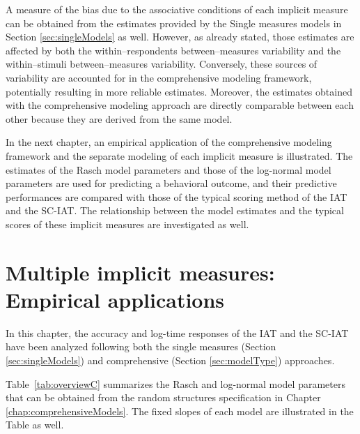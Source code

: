 \documentclass[12pt]{book}
\begin{document}
A measure of the bias due to the associative conditions of each implicit measure can be obtained from the estimates provided by the Single measures models in Section \ref{sec:singleModels} as well. However, as already stated, those estimates are affected by both the within--respondents between--measures variability and the within--stimuli between--measures variability. Conversely, these sources of variability are accounted for in the comprehensive modeling framework, potentially resulting in more reliable estimates. Moreover, the estimates obtained with the comprehensive modeling approach are directly comparable between each other because they are derived from the same model.

In the next chapter, an empirical application of the comprehensive modeling framework and the separate modeling of each implicit measure is illustrated.
	The estimates of the Rasch model parameters and those of the log-normal model parameters are used for predicting a behavioral outcome, and their predictive performances are compared with those of the typical scoring method of the IAT and the SC-IAT. 
	The relationship between the model estimates and the typical scores of these implicit measures are investigated as well. 


\chapter[Multiple implicit measures: Empirical applications]{Multiple implicit measures: Empirical applications} \label{chap:comprehensiveApplications}

In this chapter, the accuracy and log-time responses of the IAT and the SC-IAT have been analyzed following both the single measures (Section \ref{sec:singleModels}) and comprehensive  (Section \ref{sec:modelType}) approaches.


Table~\ref{tab:overviewC} summarizes the Rasch and log-normal model parameters that can be obtained from the random structures specification in Chapter \ref{chap:comprehensiveModels}.  
The fixed slopes of each model are illustrated in the Table as well.
\end{document}
